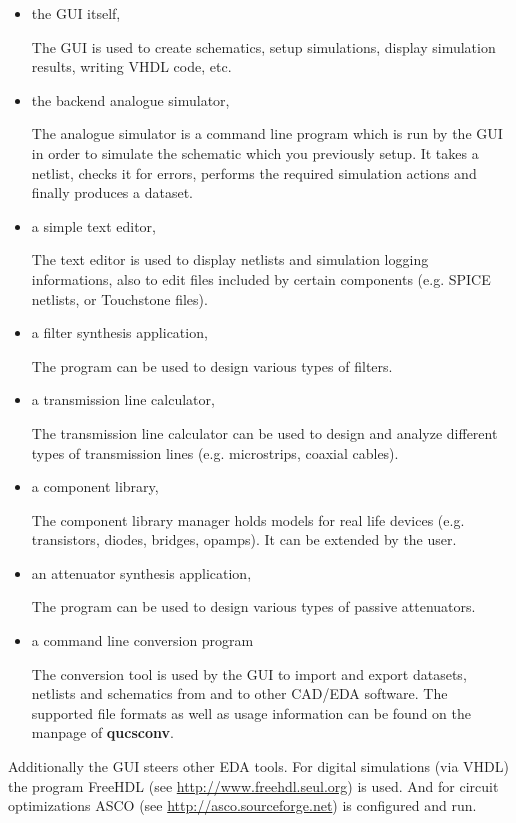 \begin{itemize}
\item the GUI itself,

The GUI is used to create schematics, setup simulations, display
simulation results, writing VHDL code, etc.

\item the backend analogue simulator,

The analogue simulator is a command line program which is run by the
GUI in order to simulate the schematic which you previously setup.  It
takes a netlist, checks it for errors, performs the required
simulation actions and finally produces a dataset.

\item a simple text editor,

The text editor is used to display netlists and simulation logging
informations, also to edit files included by certain components
(e.g. SPICE netlists, or Touchstone files).

\item a filter synthesis application,

The program can be used to design various types of filters.

\item a transmission line calculator,

The transmission line calculator can be used to design and analyze
different types of transmission lines (e.g. microstrips, coaxial
cables).

\item a component library,

The component library manager holds models for real life devices
(e.g. transistors, diodes, bridges, opamps).  It can be extended by
the user.

\item an attenuator synthesis application,

The program can be used to design various types of passive
attenuators.

\item a command line conversion program

The conversion tool is used by the GUI to import and export datasets,
netlists and schematics from and to other CAD/EDA software.  The
supported file formats as well as usage information can be found on
the manpage of \textbf{qucsconv}.

\end{itemize}

Additionally the GUI steers other EDA tools.  For digital simulations
(via VHDL) the program FreeHDL (see \url{http://www.freehdl.seul.org})
is used.  And for circuit optimizations ASCO (see
\url{http://asco.sourceforge.net}) is configured and run.

